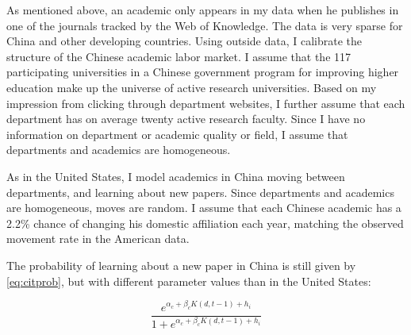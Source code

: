 As mentioned above, an academic only appears in my data when he
publishes in one of the journals tracked by the Web of Knowledge.  The
data is very sparse for China and other developing countries.  Using outside data,
I calibrate the structure of the Chinese 
academic labor market.  I assume that the 117 participating universities in
a Chinese government program for improving higher education make up the universe
of active research universities.\footnotemark{}
   Based on my impression from clicking through 
department websites, I further assume that each department has on average
twenty active research faculty.  Since I have no information on department or academic 
quality or field, I assume that departments and academics are homogeneous.

As in the United States, I model academics in China moving between departments,
and learning about new papers.  Since departments and academics are 
homogeneous, moves are random.  I assume that each Chinese academic has a 2.2\%
chance of changing his domestic affiliation each year, matching the observed 
movement rate in the American data.

The probability of learning about a new paper in China is still given by
\eqref{eq:citprob}, but with different parameter values than in the United
States:  

\begin{equation}
    \frac{e^{\alpha_c + \beta_c K(d,t-1) + h_i}}{1 + e^{\alpha_c + \beta_c K(d,t-1) + h_i}}
    \label{eq:citprob_china}
\end{equation}

